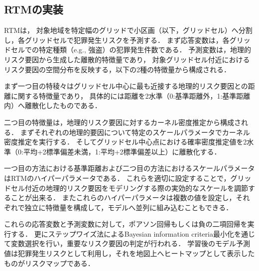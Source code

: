 \subsection{RTMの実装}
\label{conv_imp:sec}
RTM\cite{caplan2015risk}は，
対象地域を特定幅のグリッドで小区画（以下，グリッドセル）へ分割し，各グリッドセルで犯罪発生リスクを予測する．
まず応答変数は，各グリッドセルでの特定種類（e.g., 強盗）の犯罪発生件数である．
予測変数は，地理的リスク要因から生成した離散的特徴量であり，
対象グリッドセル付近におけるリスク要因の空間分布を反映する，以下の2種の特徴量から構成される．

まず一つ目の特稜々はグリッドセル中心に最も近接する地理的リスク要因との距離に関する特徴量であり，
具体的には距離を2水準（0:基準距離外，1:基準距離内）へ離散化したものである．

二つ目の特徴量は，地理的リスク要因に対するカーネル密度推定から構成される．
まずそれぞれの地理的要因について特定のスケールパラメータでカーネル密度推定を実行する\cite{bishop}．
そしてグリッドセル中心点における確率密度推定値を2水準（0:平均+2標準偏差未満，1:平均+2標準偏差以上）に離散化する．

一つ目の方法における基準距離および二つ目の方法におけるスケールパラメータはRTMのハイパーパラメータである．
これらを適切に設定することで，グリッドセル付近の地理的リスク要因をモデリングする際の実効的なスケールを調節することが出来る．
またこれらのハイパーパラメータは複数の値を設定し，それぞれで独立に特徴量を構成して，モデルへ並列に組み込むこともできる．

これらの応答変数と予測変数に対して，ポアソン回帰\cite{poisson}もしくは負の二項回帰\cite{Hilbe_2011}を実行する．
更にステップワイズ法\cite{islp}によるBayesian information criteria最小化を通じて変数選択を行い，重要なリスク要因の判定が行われる．
学習後のモデル予測値は犯罪発生リスクとして利用し，それを地図上へヒートマップとして表示したものがリスクマップである．

 
 

